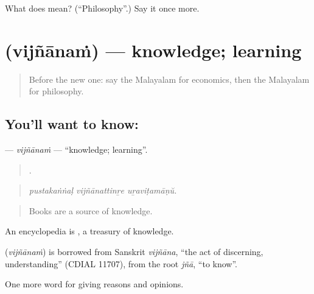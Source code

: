 \begin{tcolorbox}[breakable,colback=teal!4,colframe=teal!35!black,title={Before you move on}]
What does  mean? (\textquotedblleft{}Philosophy\textquotedblright{}.) Say it once more.
\end{tcolorbox}
\section[\texorpdfstring{\ml{വിജ്ഞാനം} (vijñānaṁ)}{വിജ്ഞാനം (vijñānaṁ)}]{ (vijñānaṁ) — knowledge; learning}

\label{lesson:ML-C437-vijnanam}



\begin{quote}
Before the new one: say the Malayalam for economics, then the Malayalam for philosophy.
\end{quote}

\subsection*{You'll want to know: }
\textbf{} — \emph{vijñānaṁ} — \textquotedblleft{}knowledge; learning\textquotedblright{}.

\begin{quote}
  .
\end{quote}

\begin{quote}
\emph{pustakaṅṅaḷ vijñānattinṟe uṟaviṭamāṇŭ.}
\end{quote}

\begin{quote}
Books are a source of knowledge.
\end{quote}

An encyclopedia is , a treasury of knowledge.

\begin{cousinweb}
\textbf{} (\emph{vijñānaṁ}) is borrowed from Sanskrit \emph{vijñāna}, \textquotedblleft{}the act of discerning, understanding\textquotedblright{} (CDIAL 11707), from the root \emph{jñā}, \textquotedblleft{}to know\textquotedblright{}.
\end{cousinweb}

\begin{grammarlens}[title={What you've built}]
One more word for giving reasons and opinions.
\end{grammarlens}

